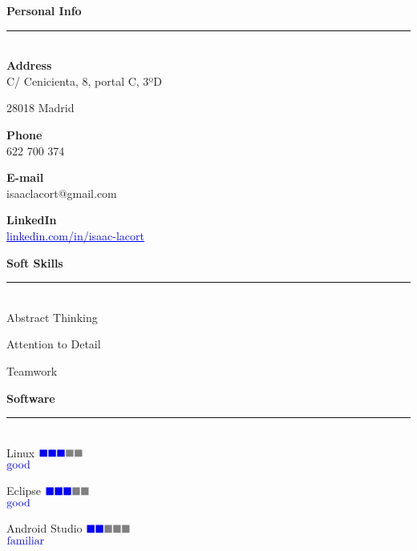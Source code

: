\documentclass{article}
\begin{document}
\begin{minipage}{0.3\linewidth}
  
  \setlength{\parskip}{0.3em}
  \textbf{\Large{\color{BlueViolet}Personal Info}}\\[-0.25cm]
  {\color{BlueViolet} \rule{\linewidth}{0.1mm} } \\[-0.25cm]
  \textbf{\large{Address}}\\  
  C/ Cenicienta, 8, portal C, 3ºD
  
  28018 Madrid

  \textbf{\large{Phone}}\\
  622 700 374

  \textbf{\large{E-mail}}\\
  isaaclacort@gmail.com
  
  \textbf{\large{LinkedIn}}\\
  \href{https://www.linkedin.com/in/isaac-lacort-706725168/}{\textcolor{blue}{\underline{linkedin.com/in/isaac-lacort}}}
  
  \vspace{0.3cm}
  \textbf{\Large{\color{BlueViolet}Soft Skills}}\\[-0.25cm]
  {\color{BlueViolet} \rule{\linewidth}{0.1mm} }\\[-0.25cm]
  Abstract Thinking 

  Attention to Detail

  Teamwork
  
  \vspace{0.3cm}
  \textbf{\Large{\color{BlueViolet}Software}}\\[-0.25cm]
  {\color{BlueViolet} \rule{\linewidth}{0.1mm} }\\
  \large Linux \hfill $\color{blue} \blacksquare\color{blue} \blacksquare \color{blue} \blacksquare \color{gray} \blacksquare  \color{gray} \blacksquare$  \\[-0.8mm]
  \null\hfill \small{ $\color{blue} \textnormal{good}$}

  \large Eclipse \hfill $\color{blue} \blacksquare\color{blue} \blacksquare \color{blue} \blacksquare \color{gray} \blacksquare  \color{gray} \blacksquare$  \\[-0.8mm]
  \null\hfill \small{ $\color{blue} \textnormal{good}$}

  \large Android Studio \hfill $\color{blue} \blacksquare\color{blue} \blacksquare \color{gray} \blacksquare \color{gray} \blacksquare  \color{gray} \blacksquare$  \\[-0.8mm]
  \null\hfill \small{ $\color{blue} \textnormal{familiar}$}


\end{minipage}
\end{document}
